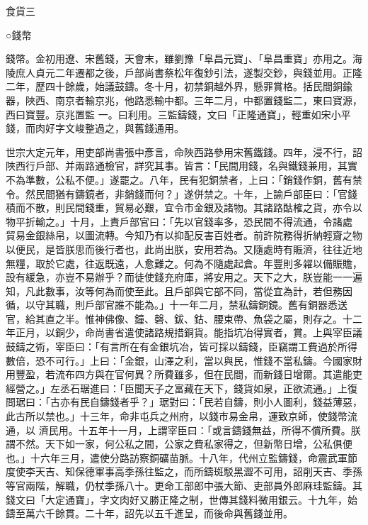 
\begin{pinyinscope}

 食貨三



 ○錢幣



 錢幣。金初用遼、宋舊錢，天會末，雖劉豫「阜昌元寶」、「阜昌重寶」亦用之。海陵庶人貞元二年遷都之後，戶部尚書蔡松年復鈔引法，遂製交鈔，與錢並用。正隆二年，歷四十餘歲，始議鼓鑄。冬十月，初禁銅越外界，懸罪賞格。括民間銅鍮器，陜西、南京者輸京兆，他路悉輸中都。三年二月，中都置錢監二，東曰寶源，西曰寶豐。京兆置監
 一。曰利用。三監鑄錢，文曰「正隆通寶」，輕重如宋小平錢，而肉好字文峻整過之，與舊錢通用。



 世宗大定元年，用吏部尚書張中彥言，命陜西路參用宋舊鐵錢。四年，浸不行，詔陜西行戶部、并兩路通檢官，詳究其事。皆言：「民間用錢，名與鐵錢兼用，其實不為準數，公私不便。」遂罷之。八年，民有犯銅禁者，上曰：「銷錢作銅，舊有禁令。然民間猶有鑄鏡者，非銷錢而何？」遂併禁之。十年，上諭戶部臣曰：「官錢積而不散，則民間錢重，貿易必艱，宜令市金銀及諸物。其諸路酤榷之貨，亦令以物平折輸之。」十月，上責戶部官曰：「先以官錢率多，恐民間不得流通，令諸處
 貿易金銀絲帛，以圖流轉。今知乃有以抑配反害百姓者。前許院務得折納輕齎之物以便民，是皆朕思而後行者也，此尚出朕，安用若為。又隨處時有賑濟，往往近地無糧，取於它處，往返既遠，人愈難之。何為不隨處起倉。年豐則多糴以備賑贍，設有緩急，亦豈不易辦乎？而徒使錢充府庫，將安用之。天下之大，朕豈能一一遍知，凡此數事，汝等何為而使至此。且戶部與它部不同，當從宜為計，若但務因循，以守其職，則戶部官誰不能為。」十一年二月，禁私鑄銅鏡。舊有銅器悉送官，給其直之半。惟神佛像、鐘、磬、鈸、鈷、腰束帶、魚袋之屬，則存之。十二
 年正月，以銅少，命尚書省遣使諸路規措銅貨。能指坑冶得實者，賞。上與宰臣議鼓鑄之術，宰臣曰：「有言所在有金銀坑冶，皆可採以鑄錢，臣竊謂工費過於所得數倍，恐不可行。」上曰：「金銀，山澤之利，當以與民，惟錢不當私鑄。今國家財用豐盈，若流布四方與在官何異？所費雖多，但在民間，而新錢日增爾。其遣能吏經營之。」左丞石琚進曰：「臣聞天子之富藏在天下，錢貨如泉，正欲流通。」上復問琚曰：「古亦有民自鑄錢者乎？」琚對曰：「民若自鑄，則小人圖利，錢益薄惡，此古所以禁也。」十三年，命非屯兵之州府，以錢市易金帛，運致京師，使錢幣流通，以
 濟民用。十五年十一月，上謂宰臣曰：「或言鑄錢無益，所得不償所費。朕謂不然。天下如一家，何公私之間，公家之費私家得之，但新幣日增，公私俱便也。」十六年三月，遣使分路訪察銅礦苗脈。十八年，代州立監鑄錢，命震武軍節度使李天吉、知保德軍事高季孫往監之，而所鑄斑駁黑澀不可用，詔削天吉、季孫等官兩階，解職，仍杖季孫八十。更命工部郎中張大節、吏部員外郎麻珪監鑄。其錢文曰「大定通寶」，字文肉好又勝正隆之制，世傳其錢料微用銀云。十九年，始鑄至萬六千餘貫。二十年，詔先以五千進呈，而後命與舊錢並用。




\end{pinyinscope}
